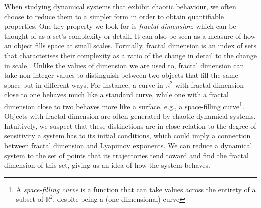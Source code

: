 
When studying dynamical systems that exhibit chaotic behaviour, we often choose to reduce them to a simpler form in order to obtain quantifiable properties. One key property we look for is \emph{fractal dimension}, which can be thought of as a set's complexity or detail. It can also be seen as a measure of how an object fills space at small scales. Formally, fractal dimension is an index of sets that characterises their complexity as a ratio of the change in detail to the change in scale \cite{mandelbrot1983fractal}. Unlike the values of dimension we are used to, fractal dimension can take non-integer values to distinguish between two objects that fill the same space but in different ways. For instance, a curve in $\mathbb{R}^2$ with fractal dimension close to one behaves much like a standard curve, while one with a fractal dimension close to two behaves more like a surface, e.g., a space-filling curve\footnote{A \textit{space-filling curve} is a function that can take values across the entirety of a subset of $\mathbb{R}^2$, despite being a (one-dimensional) curve}. Objects with fractal dimension are often generated by chaotic dynamical systems. Intuitively, we suspect that these distinctions are in close relation to the degree of sensitivity a system has to its initial conditions, which could imply a connection between fractal dimension and Lyapunov exponents. We can reduce a dynamical system to the set of points that its trajectories tend toward and find the fractal dimension of this set, giving us an idea of how the system behaves.

